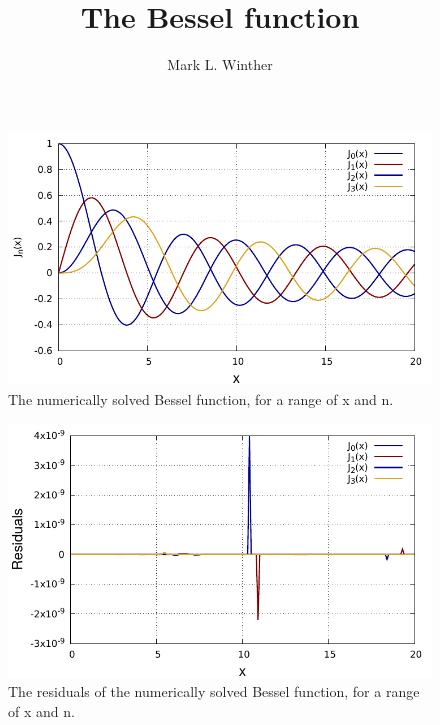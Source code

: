 \documentclass[twocolumn]{article}
\author{Mark L. Winther}
\title{The Bessel function}
\begin{document}
\maketitle


\begin{figure}[ht]
	\centering
	\includegraphics[width=\linewidth]{fig.pdf}
	\caption{The numerically solved Bessel function, for a range of x and n.}
	\label{fig:1}
\end{figure}

\begin{figure}[ht]
	\centering
	\includegraphics[width=\linewidth]{fig2.pdf}
	\caption{The residuals of the numerically solved Bessel function, for a range of x and n.}
	\label{fig:2}
\end{figure}

\cite{wiki}


\printbibliography
\end{document}
